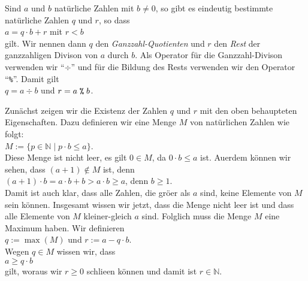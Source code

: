 \begin{Satz}
  \label{satz:division_mit_rest}
  Sind $a$ und $b$ nat\"{u}rliche Zahlen mit $b \not= 0$, so gibt es eindeutig bestimmte nat\"{u}rliche Zahlen 
  $q$ und $r$, so dass 
  \\[0.2cm]
  \hspace*{1.3cm}
  $a = q \cdot b + r$ \quad mit $r < b$
  \\[0.2cm]
  gilt.  Wir nennen dann $q$ den \emph{Ganzzahl-Quotienten} und $r$ den \emph{Rest} der ganzzahligen
  Divison von $a$ durch $b$.  Als Operator f\"{u}r die Ganzzahl-Divison verwenden wir ``$\div$''
  und f\"{u}r die Bildung des Rests verwenden wir den Operator ``\texttt{\%}''.
  Damit gilt 
  \\[0.2cm]
  \hspace*{1.3cm}
  $q = a \div b$ \quad und \quad $r = a \;\texttt{\%}\; b$.
\end{Satz}  

\proof
Zun\"{a}chst zeigen wir die Existenz der Zahlen $q$ und $r$ mit den oben behaupteten Eigenschaften.
Dazu definieren wir eine Menge $M$ von nat\"{u}rlichen Zahlen wie folgt:
\\[0.2cm]
\hspace*{1.3cm}
$M := \{ p \in \mathbb{N} \mid p \cdot b \leq a \}$.
\\[0.2cm]
Diese Menge ist nicht leer, es gilt $0 \in M$, da $0 \cdot b \leq a$ ist.
Au\3erdem k\"{o}nnen wir sehen, dass $(a+1) \not\in M$ ist, denn
\\[0.2cm]
\hspace*{1.3cm}
$(a+1) \cdot b = a \cdot b + b > a \cdot b \geq a$, \quad denn $b \geq 1$.
\\[0.2cm]
Damit ist auch klar, dass alle Zahlen, die gr\"{o}\3er als $a$ sind, keine Elemente
von $M$ sein k\"{o}nnen.  Insgesamt wissen wir jetzt, dass die Menge nicht leer ist und dass alle
Elemente von $M$ kleiner-gleich $a$ sind.  Folglich muss die Menge $M$ eine Maximum haben.
Wir definieren
\\[0.2cm]
\hspace*{1.3cm}
$q := \max(M)$ \quad und \quad $r := a - q \cdot b$.
\\[0.2cm]
Wegen $q \in M$ wissen wir, dass
\\[0.2cm]
\hspace*{1.3cm}
$a \geq q \cdot b$
\\[0.2cm]
gilt, woraus wir $r \geq 0$ schlie\3en k\"{o}nnen und damit ist $r \in \mathbb{N}$.

